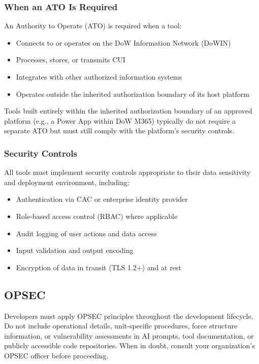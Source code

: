 \documentclass[11pt,letterpaper]{article}
\begin{document}
\subsubsection{When an ATO Is Required}
\label{sec:ato-requirements}

An Authority to Operate (ATO) is required when a tool:

\begin{itemize}
  \item Connects to or operates on the DoW Information Network (DoWIN)
  \item Processes, stores, or transmits CUI
  \item Integrates with other authorized information systems
  \item Operates outside the inherited authorization boundary of its host platform
\end{itemize}

Tools built entirely within the inherited authorization boundary of an approved platform
(e.g., a Power App within DoW M365) typically do not require a separate ATO but must
still comply with the platform's security controls.

\subsubsection{Security Controls}
\label{sec:security-controls}

All tools must implement security controls appropriate to their data sensitivity and
deployment environment, including:

\begin{itemize}
  \item Authentication via CAC or enterprise identity provider
  \item Role-based access control (RBAC) where applicable
  \item Audit logging of user actions and data access
  \item Input validation and output encoding
  \item Encryption of data in transit (TLS 1.2+) and at rest
\end{itemize}

\subsection{OPSEC}
\label{sec:opsec}

Developers must apply OPSEC principles throughout the development lifecycle. Do not
include operational details, unit-specific procedures, force structure information,
or vulnerability assessments in AI prompts, tool documentation, or publicly accessible
code repositories. When in doubt, consult your organization's OPSEC officer before
proceeding.
\end{document}
